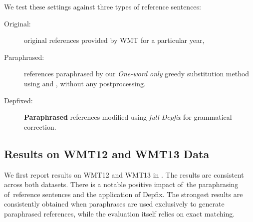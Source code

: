 We test these \mn settings against three types of reference sentences:
\begin{description}
\item[Original:] original references provided by WMT for a particular year,
\item[Paraphrased:] references paraphrased by our \emph{One-word only} greedy substitution method using \fm and \wordnet, without any postprocessing.
\item[Depfixed:] \textbf{Paraphrased} references modified using \emph{full Depfix} for grammatical correction.
\end{description}

\subsection{Results on WMT12 and WMT13 Data}
\label{results-12-13}
We first report results on WMT12 and WMT13 in . The results are consistent across both datasets. There is a notable positive impact of~the paraphrasing of~reference sentences and the application of Depfix. The strongest results are consistently obtained when paraphrases are used exclusively to generate paraphrased references, while the evaluation itself relies on exact matching.

